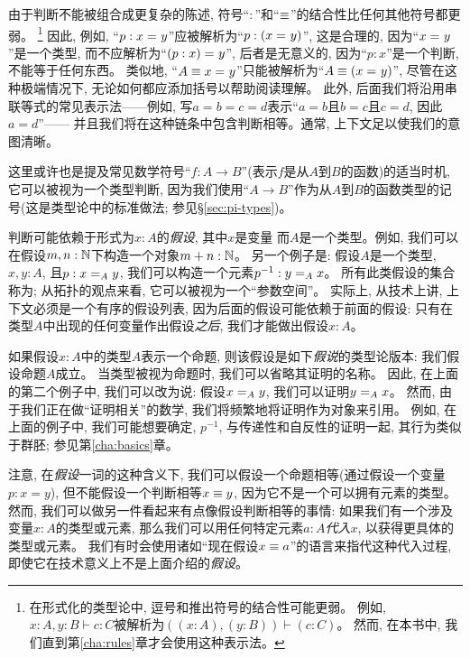 由于判断不能被组合成更复杂的陈述, 符号``$:$''和``$\jdeq$''的结合性比任何其他符号都更弱。%
\footnote{在形式化的类型论中, 逗号和推出符号的结合性可能更弱。
  例如, $x:A,y:B\vdash c:C$被解析为$((x:A),(y:B))\vdash (c:C)$。
  然而, 在本书中, 我们直到第\ref{cha:rules}章才会使用这种表示法。}
因此, 例如, ``$p:\id{x}{y}$''应被解析为``$p:(\id{x}{y})$'', 这是合理的, 因为``$\id{x}{y}$''是一个类型, 而不应解析为``$\id{(p:x)}{y}$'', 
后者是无意义的, 因为``$p:x$''是一个判断, 不能等于任何东西。
类似地, ``$A\jdeq \id{x}{y}$''只能被解析为``$A\jdeq(\id{x}{y})$'', 尽管在这种极端情况下, 无论如何都应添加括号以帮助阅读理解。
此外, 后面我们将沿用串联等式的常见表示法——例如, 写$a=b=c=d$表示``$a=b$且$b=c$且$c=d$, 因此$a=d$''——
并且我们将在这种链条中包含判断相等。通常, 上下文足以使我们的意图清晰。

这里或许也是提及常见数学符号``$f:A\to B$''(表示$f$是从$A$到$B$的函数)的适当时机, 
它可以被视为一个类型判断, 因为我们使用``$A\to B$''作为从$A$到$B$的函数类型的记号(这是类型论中的标准做法; 参见\S\ref{sec:pi-types})。

%
判断可能依赖于形式为$x:A$的\emph{假设}, 其中$x$是变量
%
而$A$是一个类型。例如, 我们可以在假设$m,n : \nat$下构造一个对象$m + n : \nat$。
另一个例子是: 假设$A$是一个类型, $x,y : A$, 且$p : \id[A]{x}{y}$, 我们可以构造一个元素$p^{-1} : \id[A]{y}{x}$。
所有此类假设的集合称为; %
从拓扑的观点来看, 它可以被视为一个``参数空间''。
实际上, 从技术上讲, 上下文必须是一个有序的假设列表, 因为后面的假设可能依赖于前面的假设: 
只有在类型$A$中出现的任何变量作出假设\emph{之后}, 我们才能做出假设$x:A$。

如果假设$x:A$中的类型$A$表示一个命题, 则该假设是如下\emph{假说}的类型论版本: 
%
我们假设命题$A$成立。
当类型被视为命题时, 我们可以省略其证明的名称。
因此, 在上面的第二个例子中, 我们可以改为说: 假设$\id[A]{x}{y}$, 我们可以证明$\id[A]{y}{x}$。
然而, 由于我们正在做``证明相关''的数学, 
%
我们将频繁地将证明作为对象来引用。
例如, 在上面的例子中, 我们可能想要确定, $p^{-1}$, 与传递性和自反性的证明一起, 其行为类似于群胚; 参见第\ref{cha:basics}章。

注意, 在\emph{假设}一词的这种含义下, 我们可以假设一个命题相等(通过假设一个变量$p:x=y$), 但不能假设一个判断相等$x\jdeq y$, 
因为它不是一个可以拥有元素的类型。
然而, 我们可以做另一件看起来有点像假设判断相等的事情: 如果我们有一个涉及变量$x:A$的类型或元素, 
那么我们可以用任何特定元素$a:A$\emph{代入}$x$, 以获得更具体的类型或元素。
我们有时会使用诸如``现在假设$x\jdeq a$''的语言来指代这种代入过程, 即使它在技术意义上不是上面介绍的\emph{假设}。
%

